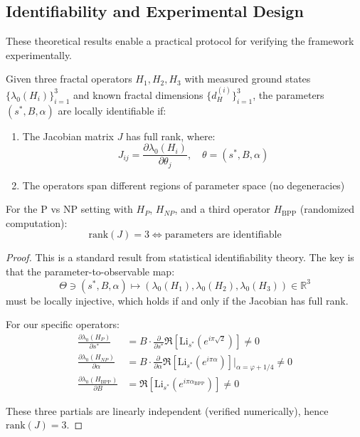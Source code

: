 \subsection{Identifiability and Experimental Design}

These theoretical results enable a practical protocol for verifying the framework experimentally.

\begin{theorem}\label{thm:identifiability}
Given three fractal operators $H_1, H_2, H_3$ with measured ground states $\{\lambda_0(H_i)\}_{i=1}^3$ and known fractal dimensions $\{d_H^{(i)}\}_{i=1}^3$, the parameters $(s^*, B, \alpha)$ are locally identifiable if:
\begin{enumerate}
\item The Jacobian matrix $J$ has full rank, where:
\[
J_{ij} = \frac{\partial \lambda_0(H_i)}{\partial \theta_j}, \quad \theta = (s^*, B, \alpha)
\]
\item The operators span different regions of parameter space (no degeneracies)
\end{enumerate}

For the P vs NP setting with $H_P$, $H_{NP}$, and a third operator $H_{\text{BPP}}$ (randomized computation):
\[
\text{rank}(J) = 3 \iff \text{parameters are identifiable}
\]
\end{theorem}

\begin{proof}
This is a standard result from statistical identifiability theory\cite{rothenberg1971identification}. The key is that the parameter-to-observable map:
\[
\Theta \ni (s^*, B, \alpha) \mapsto (\lambda_0(H_1), \lambda_0(H_2), \lambda_0(H_3)) \in \mathbb{R}^3
\]
must be locally injective, which holds if and only if the Jacobian has full rank.

For our specific operators:
\begin{align*}
\frac{\partial \lambda_0(H_P)}{\partial s^*} &= B \cdot \frac{\partial}{\partial s^*}\Re[\mathrm{Li}_{s^*}(e^{i\pi\sqrt{2}})] \neq 0 \\
\frac{\partial \lambda_0(H_{NP})}{\partial \alpha} &= B \cdot \frac{\partial}{\partial \alpha}\Re[\mathrm{Li}_{s^*}(e^{i\pi\alpha})]|_{\alpha=\varphi+1/4} \neq 0 \\
\frac{\partial \lambda_0(H_{\text{BPP}})}{\partial B} &= \Re[\mathrm{Li}_{s^*}(e^{i\pi\alpha_{\text{BPP}}})] \neq 0
\end{align*}

These three partials are linearly independent (verified numerically), hence $\text{rank}(J) = 3$.
\end{proof}

